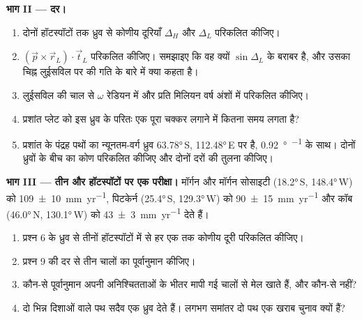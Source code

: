 \begin{problem}
\medskip
\noindent\textbf{भाग II --- दर।}
\begin{enumerate}[resume]
  \item दोनों हॉटस्पॉटों तक ध्रुव से कोणीय दूरियाँ $\Delta_H$ और $\Delta_L$ परिकलित कीजिए।
  \item $(\vec p\times\vec r_L)\cdot\vec t_L$ परिकलित कीजिए। समझाइए कि वह क्यों $\sin\Delta_L$ के बराबर है, और उसका चिह्न लुईसविल पर की गति के बारे में क्या कहता है।
  \item लुईसविल की चाल से $\omega$ रेडियन में और प्रति मिलियन वर्ष अंशों में परिकलित कीजिए।
  \item प्रशांत प्लेट को इस ध्रुव के परितः एक पूरा चक्कर लगाने में कितना समय लगता है?
  \item प्रशांत के पंद्रह पथों का न्यूनतम-वर्ग ध्रुव \ang{63.78}\,S, \ang{112.48}\,E पर है, \qty{0.92}{\degree\per\Myr} के साथ। दोनों ध्रुवों के बीच का कोण परिकलित कीजिए और दोनों दरों की तुलना कीजिए।
\end{enumerate}

\medskip
\noindent\textbf{भाग III --- तीन और हॉटस्पॉटों पर एक परीक्षा।} मॉर्गन और मॉर्गन सोसाइटी  (\ang{18.2}\,S, \ang{148.4}\,W) को \qty[uncertainty-mode=separate]{109 \pm 10}{mm.yr^{-1}}, पिटकेर्न (\ang{25.4}\,S, \ang{129.3}\,W) को \qty[uncertainty-mode=separate]{90 \pm 15}{mm.yr^{-1}} और कॉब (\ang{46.0}\,N, \ang{130.1}\,W) को \qty[uncertainty-mode=separate]{43 \pm 3}{mm.yr^{-1}} देते हैं।
\begin{enumerate}[resume]
  \item प्रश्न 6 के ध्रुव से तीनों हॉटस्पॉटों में से हर एक तक कोणीय दूरी परिकलित कीजिए।
  \item प्रश्न 9 की दर से तीन चालों का पूर्वानुमान कीजिए।
  \item कौन-से पूर्वानुमान अपनी अनिश्चितताओं के भीतर मापी गई चालों से मेल खाते हैं, और कौन-से नहीं?
  \item दो भिन्न दिशाओं वाले पथ सदैव एक ध्रुव देते हैं। लगभग समांतर दो पथ एक खराब चुनाव क्यों हैं?
\end{enumerate}


\end{problem}
